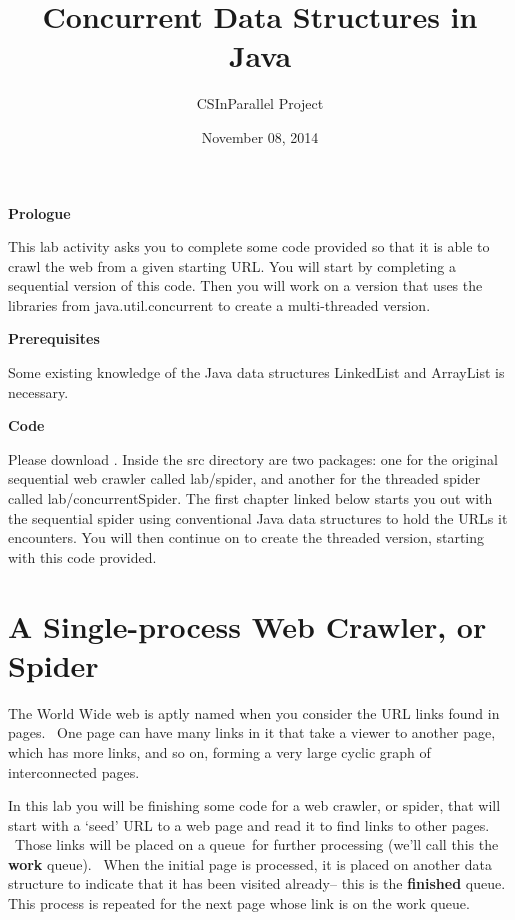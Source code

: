 \documentclass[letterpaper,10pt,openany,oneside]{sphinxmanual}
\title{Concurrent Data Structures in Java}
\date{November 08, 2014}
\author{CSInParallel Project}
\begin{document}
\maketitle
\tableofcontents
{}\label{index::doc}


\textbf{Prologue}

This lab activity asks you to complete some code provided so that it is able to crawl the web from a given starting URL.  You will start by completing a sequential version of this code.  Then you will work on a version that uses the libraries from java.util.concurrent to create a multi-threaded version.

\textbf{Prerequisites}

Some existing knowledge of the Java data structures LinkedList and ArrayList is necessary.

\textbf{Code}

Please download . Inside the src directory are two packages: one for the original sequential web crawler called lab/spider, and another for the threaded spider called lab/concurrentSpider. The first chapter linked below starts you out with the sequential spider using conventional Java data structures to hold the URLs it encounters. You will then continue on to create the threaded version, starting with this code provided.


\chapter{A Single-process Web Crawler, or Spider}
\label{TheSpiderLabonecrawler/TheSpiderLabonecrawler::doc}\label{TheSpiderLabonecrawler/TheSpiderLabonecrawler:concurrent-data-structures-in-java}\label{TheSpiderLabonecrawler/TheSpiderLabonecrawler:a-single-process-web-crawler-or-spider}
The World Wide web is aptly named when you consider the URL links
found in pages.  One page can have many links in it that take a
viewer to another page, which has more links, and so on, forming a
very large cyclic graph of interconnected pages.

In this lab you
will be finishing some code for a web crawler, or spider, that will
start with a ‘seed’ URL to a web page and read it to find links to
other pages.  Those links will be placed on a queue for further
processing (we’ll call this the \textbf{work} queue).  When the initial page
is processed, it is placed on another data structure to indicate
that it has been visited already-- this is the \textbf{finished} queue.
This process is repeated for the next
page whose link is on the work queue.
\end{document}
